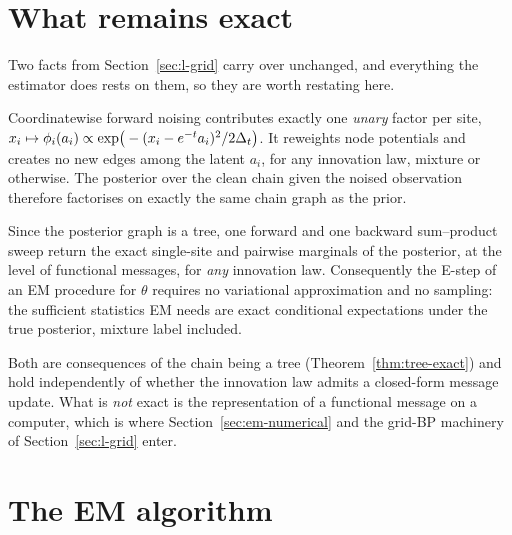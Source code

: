 \section{What remains exact}\label{sec:em-exact}

Two facts from Section~\ref{sec:l-grid} carry over unchanged, and everything
the estimator does rests on them, so they are worth restating here.

\begin{proposition}
\label{prop:em-unary}
Coordinatewise forward noising contributes exactly one \emph{unary} factor per
site, $x_i \mapsto \phi_i(a_i) \propto \exp\!\big(-(x_i-e^{-t}a_i)^2/2\Delta_t\big)$.
It reweights node potentials and creates no new edges among the latent
$a_i$, for any innovation law, mixture or otherwise. The posterior over the
clean chain given the noised observation therefore factorises on exactly the
same chain graph as the prior.
\end{proposition}

\begin{proposition}\label{prop:em-estep}
Since the posterior graph is a tree, one forward and one backward
sum--product sweep return the exact single-site and pairwise marginals of the
posterior, at the level of functional messages, for \emph{any} innovation
law. Consequently the E-step of an EM procedure for $\theta$ requires no
variational approximation and no sampling: the sufficient statistics EM needs
are exact conditional expectations under the true posterior, mixture label
included.
\end{proposition}

Both are consequences of the chain being a tree (Theorem~\ref{thm:tree-exact})
and hold independently of whether the innovation law admits a closed-form
message update. What is \emph{not} exact is the representation of a functional
message on a computer, which is where Section~\ref{sec:em-numerical} and the
grid-BP machinery of Section~\ref{sec:l-grid} enter.

\section{The EM algorithm}\label{sec:em-algorithm}

